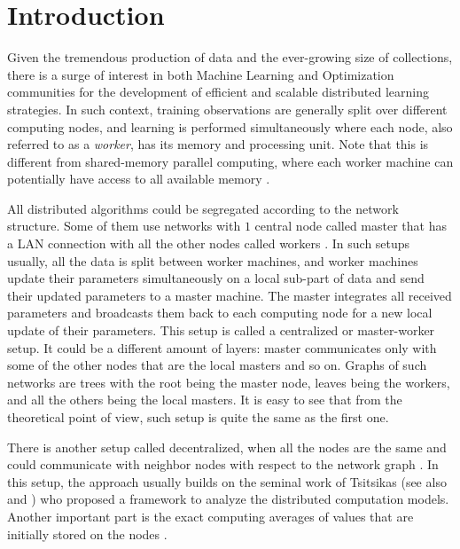 \section{Introduction}\label{sec:distributed-intro}

Given the tremendous production of data and the ever-growing size of collections, there is a surge of interest in both Machine Learning and Optimization communities for the development of efficient and scalable distributed learning strategies. In such context, training observations are generally split over different computing nodes, and learning is performed simultaneously where each node, also referred to as a \textit{worker}, has its memory and processing unit.  Note that this is different from shared-memory parallel computing, where each worker machine can potentially have access to all available memory \cite{Leslie91, Kumar02}. 

All distributed algorithms could be segregated according to the network structure. Some of them use networks with $1$ central node called master that has a LAN connection with all the other nodes called workers \cite{konevcny2016federated,konevcny2016federated2,mishchenko2018}. In such setups usually, all the data is split between worker machines, and worker machines update their parameters simultaneously on a local sub-part of data and send their updated parameters to a master machine. The master integrates all received parameters and broadcasts them back to each computing node for a new local update of their parameters. This setup is called a centralized or master-worker setup. It could be a different amount of layers: master communicates only with some of the other nodes that are the local masters and so on. Graphs of such networks are trees with the root being the master node, leaves being the workers, and all the others being the local masters. It is easy to see that from the theoretical point of view, such setup is quite the same as the first one.

There is another setup called decentralized, when all the nodes are the same and could communicate with neighbor nodes with respect to the network graph \cite{nedic2009distributed, boyd2011distributed, duchi2011dual, shi2015extra}. In this setup, the approach usually builds on the seminal work of Tsitsikas \cite{tsitsiklis1984problems} (see also \cite{bertsekas1997parallel} and \cite{tsitsiklis1986distributed}) who proposed a framework to analyze the distributed computation models. Another important part is the exact computing averages of values that are initially stored on the nodes \cite{boyd2011distributed, olshevsky2006convergence,olshevsky2009convergence}. 

